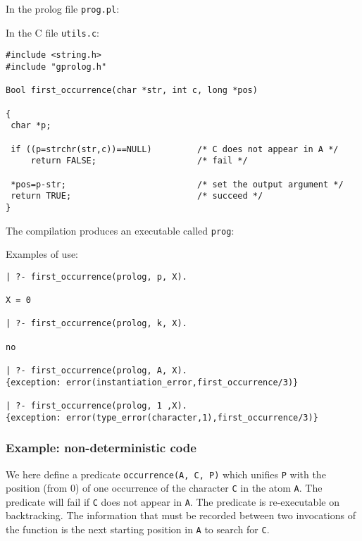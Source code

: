 In the prolog file \texttt{prog.pl}:


In the C file \texttt{utils.c}:

\begin{Indentation}
\begin{verbatim}
#include <string.h>
#include "gprolog.h"

Bool first_occurrence(char *str, int c, long *pos)

{
 char *p;

 if ((p=strchr(str,c))==NULL)         /* C does not appear in A */
     return FALSE;                    /* fail */

 *pos=p-str;                          /* set the output argument */
 return TRUE;                         /* succeed */
}
\end{verbatim}
\end{Indentation}

The compilation produces an executable called \texttt{prog}:


Examples of use:

\begin{Indentation}
\begin{verbatim}
| ?- first_occurrence(prolog, p, X).

X = 0

| ?- first_occurrence(prolog, k, X).

no

| ?- first_occurrence(prolog, A, X).
{exception: error(instantiation_error,first_occurrence/3)}

| ?- first_occurrence(prolog, 1 ,X).
{exception: error(type_error(character,1),first_occurrence/3)}
\end{verbatim}
\end{Indentation}

\subsubsection{Example: non-deterministic code}
We here define a predicate \texttt{occurrence(A, C, P)} which unifies
\texttt{P} with the position (from 0) of one occurrence of the character
\texttt{C} in the atom \texttt{A}. The predicate will fail if \texttt{C}
does not appear in \texttt{A}. The predicate is re-executable on
backtracking. The information that must be recorded between two invocations
of the function is the next starting position in \texttt{A} to search for
\texttt{C}.

